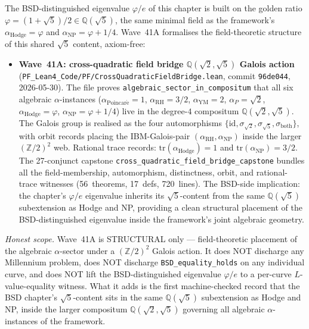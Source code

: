 \begin{remark}\label{rem:bsd-wave41-lean}
The BSD-distinguished eigenvalue $\varphi/e$ of this chapter is built on the golden ratio $\varphi = (1+\sqrt{5})/2 \in \mathbb{Q}(\sqrt{5})$, the same minimal field as the framework's $\alpha_{\mathrm{Hodge}} = \varphi$ and $\alpha_{\mathrm{NP}} = \varphi + 1/4$. Wave~41A formalises the field-theoretic structure of this shared $\sqrt{5}$ content, axiom-free:
\begin{itemize}
  \item \textbf{Wave~41A: cross-quadratic field bridge $\mathbb{Q}(\sqrt{2}, \sqrt{5})$ Galois action} (\texttt{PF\_Lean4\_Code/PF/CrossQuadraticFieldBridge.lean}, commit \texttt{96de044}, 2026-05-30). The file proves \texttt{algebraic\_sector\_in\_compositum} that all six algebraic $\alpha$-instances ($\alpha_{\mathrm{Poincar\acute e}} = 1$, $\alpha_{\mathrm{RH}} = 3/2$, $\alpha_{\mathrm{YM}} = 2$, $\alpha_P = \sqrt{2}$, $\alpha_{\mathrm{Hodge}} = \varphi$, $\alpha_{\mathrm{NP}} = \varphi + 1/4$) live in the degree-$4$ compositum $\mathbb{Q}(\sqrt{2}, \sqrt{5})$. The Galois group is realised as the four automorphisms $\{\mathrm{id}, \sigma_{\sqrt{2}}, \sigma_{\sqrt{5}}, \sigma_{\mathrm{both}}\}$, with orbit records placing the IBM-Galois-pair $(\alpha_{\mathrm{RH}}, \alpha_{\mathrm{NP}})$ inside the larger $(\mathbb{Z}/2)^2$ web. Rational trace records: $\mathrm{tr}(\alpha_{\mathrm{Hodge}}) = 1$ and $\mathrm{tr}(\alpha_{\mathrm{NP}}) = 3/2$. The 27-conjunct capstone \texttt{cross\_quadratic\_field\_bridge\_capstone} bundles all the field-membership, automorphism, distinctness, orbit, and rational-trace witnesses (56~theorems, 17~defs, 720~lines). The BSD-side implication: the chapter's $\varphi/e$ eigenvalue inherits its $\sqrt{5}$-content from the same $\mathbb{Q}(\sqrt{5})$ subextension as Hodge and NP, providing a clean structural placement of the BSD-distinguished eigenvalue inside the framework's joint algebraic geometry.
\end{itemize}

\emph{Honest scope.} Wave~41A is STRUCTURAL only --- field-theoretic placement of the algebraic $\alpha$-sector under a $(\mathbb{Z}/2)^2$ Galois action. It does NOT discharge any Millennium problem, does NOT discharge \texttt{BSD\_equality\_holds} on any individual curve, and does NOT lift the BSD-distinguished eigenvalue $\varphi/e$ to a per-curve $L$-value-equality witness. What it adds is the first machine-checked record that the BSD chapter's $\sqrt{5}$-content sits in the same $\mathbb{Q}(\sqrt{5})$ subextension as Hodge and NP, inside the larger compositum $\mathbb{Q}(\sqrt{2}, \sqrt{5})$ governing all algebraic $\alpha$-instances of the framework.
\end{remark}

